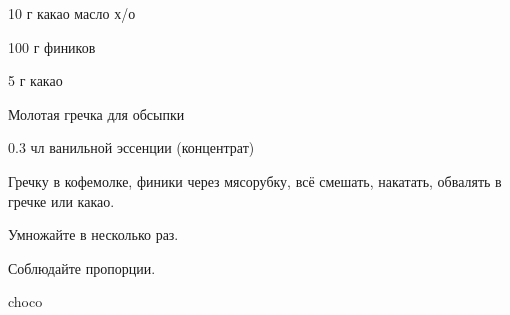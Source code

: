 {
\item 10 г какао масло х/о
\item 100 г фиников
\item 5 г какао 
\item Молотая гречка для обсыпки
}{
\item  0.3 чл ванильной эссенции (концентрат)
}{
Гречку в кофемолке, финики через мясорубку, всё смешать, накатать, обвалять в гречке или какао. 
}{
\begin{advice}
\item Умножайте в несколько раз.
\item Соблюдайте пропорции.
\end{advice}}{choco}







% 
% 
% 









